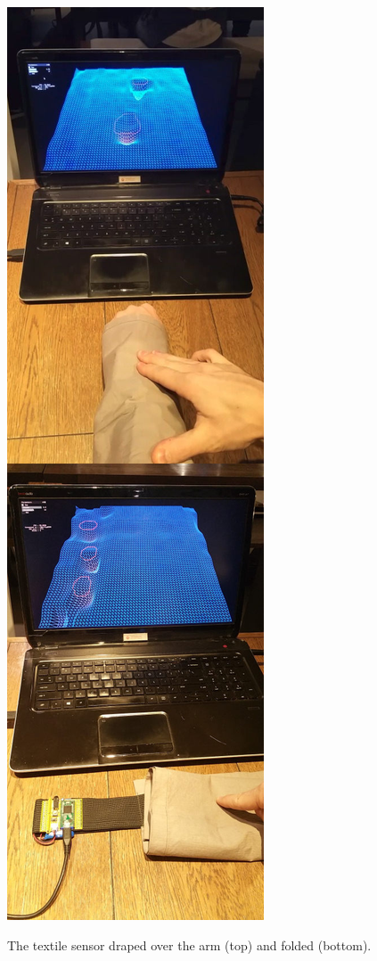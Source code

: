 \documentclass{sigchi-ext}
\begin{document}
\begin{marginfigure}[3pt]
  \begin{minipage}{\marginparwidth}
    \centering
    \includegraphics[width=0.84\marginparwidth]{figures/foldraped}
    \caption{The textile sensor draped over the arm (top) and folded (bottom).}~\label{fig:foldraped}
  \end{minipage}
\end{marginfigure}
\end{document}

